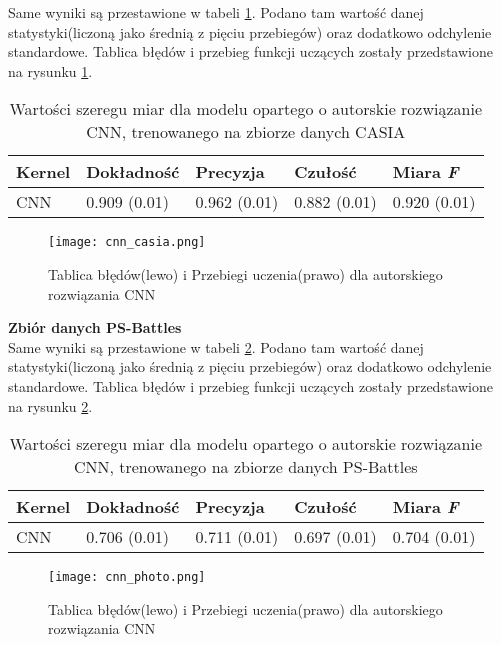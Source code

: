 Same wyniki są przestawione w tabeli \ref{tab:result_cnn}. Podano tam wartość danej statystyki(liczoną jako średnią z pięciu przebiegów) oraz dodatkowo odchylenie standardowe. Tablica błędów i przebieg funkcji uczących zostały przedstawione na rysunku \ref{fig:cnn_cm_casia}. \\
\begin{table}[h!]
	\centering
	\begin{tabular}{|l|l|l|l|l|}
		\hline
		\textbf{Kernel} & \textbf{Dokładność} & \textbf{Precyzja} & \textbf{Czułość} & \textbf{Miara \textit{F}} \\ \hline
		CNN             & 0.909 (0.01)        & 0.962 (0.01)      & 0.882 (0.01)     & 0.920 (0.01)     \\ \hline
	\end{tabular}
	\caption{Wartości szeregu miar dla modelu opartego o autorskie rozwiązanie CNN, trenowanego na zbiorze danych CASIA}
	\label{tab:result_cnn}
\end{table}

\begin{figure}[h!]
	\centering
	\texttt{[image: cnn\_casia.png]}
	\caption{Tablica błędów(lewo) i Przebiegi uczenia(prawo) dla autorskiego rozwiązania CNN}
	\label{fig:cnn_cm_casia}
\end{figure}

\textbf{Zbiór danych PS-Battles} \\

Same wyniki są przestawione w tabeli \ref{tab:result_p_cnn}. Podano tam wartość danej statystyki(liczoną jako średnią z pięciu przebiegów) oraz dodatkowo odchylenie standardowe. Tablica błędów i przebieg funkcji uczących zostały przedstawione na rysunku \ref{fig:cnn_cm_photo}.
\begin{table}[h!]
	\centering
	\begin{tabular}{|l|l|l|l|l|}
		\hline
		\textbf{Kernel} & \textbf{Dokładność} & \textbf{Precyzja} & \textbf{Czułość} & \textbf{Miara \textit{F}} \\ \hline
		CNN             & 0.706 (0.01)        & 0.711 (0.01)      & 0.697 (0.01)     & 0.704 (0.01)     \\ \hline
	\end{tabular}
	\caption{Wartości szeregu miar dla modelu opartego o autorskie rozwiązanie CNN, trenowanego na zbiorze danych PS-Battles}
	\label{tab:result_p_cnn}
\end{table}

\begin{figure}[h!]
	\centering
	\texttt{[image: cnn\_photo.png]}
	\caption{Tablica błędów(lewo) i Przebiegi uczenia(prawo) dla autorskiego rozwiązania CNN}
	\label{fig:cnn_cm_photo}
\end{figure}


